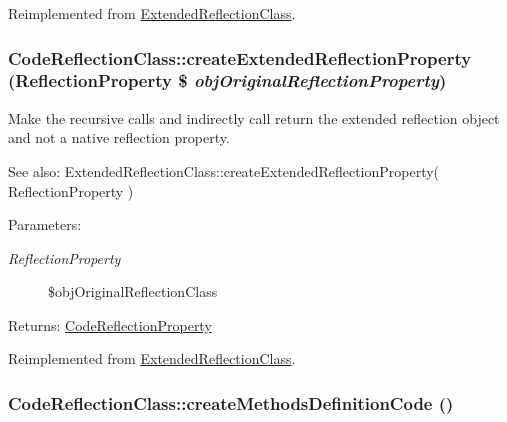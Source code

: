 Reimplemented from \hyperlink{class_extended_reflection_class_922598bd80a21577ccad6d4ca4138474}{ExtendedReflectionClass}.\hypertarget{class_code_reflection_class_838dcd22317018c53f02dda69cd07509}{
\subsubsection[{createExtendedReflectionProperty}]{\setlength{\rightskip}{0pt plus 5cm}CodeReflectionClass::createExtendedReflectionProperty (ReflectionProperty \$ {\em objOriginalReflectionProperty})}}
\label{class_code_reflection_class_838dcd22317018c53f02dda69cd07509}


Make the recursive calls and indirectly call return the extended reflection object and not a native reflection property.

\begin{Desc}
\item[See also:]ExtendedReflectionClass::createExtendedReflectionProperty( ReflectionProperty ) \end{Desc}
\begin{Desc}
\item[Parameters:]
\begin{description}
\item[{\em ReflectionProperty}]\$objOriginalReflectionClass \end{description}
\end{Desc}
\begin{Desc}
\item[Returns:]\hyperlink{class_code_reflection_property}{CodeReflectionProperty} \end{Desc}


Reimplemented from \hyperlink{class_extended_reflection_class_6259683f3d0f9583ec36ca51f6e964f9}{ExtendedReflectionClass}.\hypertarget{class_code_reflection_class_d5281e9b818a323b080cbc8fa9a07365}{
\subsubsection[{createMethodsDefinitionCode}]{\setlength{\rightskip}{0pt plus 5cm}CodeReflectionClass::createMethodsDefinitionCode ()}}
\label{class_code_reflection_class_d5281e9b818a323b080cbc8fa9a07365}


